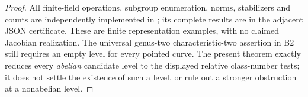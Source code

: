 \begin{proof}
All finite-field operations, subgroup enumeration, norms,
stabilizers and counts are independently implemented in
; its complete results
are in the adjacent JSON certificate. These are finite
representation examples, with no claimed Jacobian realization.
The universal genus-two characteristic-two assertion in B2
still requires an empty level for every pointed curve. The
present theorem exactly reduces every \emph{abelian} candidate
level to the displayed relative class-number tests; it does
not settle the existence of such a level, or rule out a
stronger obstruction at a nonabelian level.
\end{proof}
